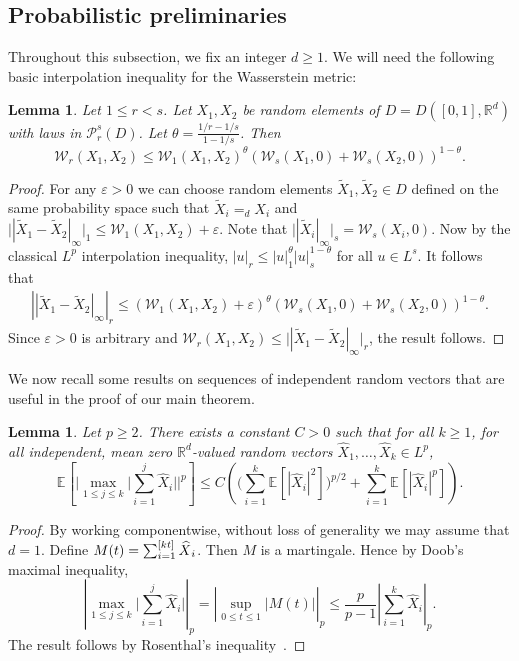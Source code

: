 \documentclass[11pt,a4paper,reqno,oneside]{amsart}
\newcommand{\R}{\ensuremath{\mathbb{R}}}%
\newcommand{\pnorm}[1]{\left|#1\right|}
\newcommand{\eqd}{=_d}
\newcommand{\Ex}[2][]{\mathbb{E}_{#1\!\!}\left[#2\right]}
\newcommand{\eps}{\varepsilon}
\newcommand{\wass}{\mathcal{W}}
\newcommand{\shat}[1]{\vphantom{#1}\smash[t]{\widehat{#1}}}
\newtheorem{lemma}[theorem]{Lemma}
\theoremstyle{definition}
\theoremstyle{remark}
\numberwithin{equation}{section}
\begin{document}
	\subsection{Probabilistic preliminaries}
	Throughout this subsection, we fix an integer $d\ge 1$. We will need the following basic interpolation inequality for the Wasserstein metric:
	\begin{lemma}\label{lem:wasserstein_interpolation}
	Let $1\le r< s$. Let $X_1,X_2$ be random elements of $D=D([0,1],\R^d)$ with laws in $ \mathcal{P}_r^s(D)$. Let $\theta = \frac{1/r-1/s}{1-1/s}$. Then 
	\[ \wass_r(X_1,X_2) \le \wass_1(X_1,X_2)^{\theta}(\wass_s(X_1,0)+\wass_s(X_2,0))^{1-\theta}. \]
\end{lemma}
\begin{proof}
	For any $\eps>0$ we can choose random elements $\tilde X_1, \tilde X_2 \in D$ defined on the same probability space such that $\tilde X_i \eqd X_i $ and $\big||\tilde X_1-\tilde X_2|_\infty\big|_1\le \wass_1(X_1,X_2)+\eps$. Note that $\big||\tilde X_i|_\infty\big|_s=\wass_s(X_i,0)$. Now by the classical $L^p$ interpolation inequality, $\pnorm{u}_r \le \pnorm{u}_1^\theta \pnorm{u}_s^{1-\theta}$ for all $u\in L^s$. It follows that
	\begin{align*}
		\pnorm{|\tilde X_1-\tilde X_2|_\infty}_r \le (\wass_1(X_1,X_2)+\eps)^\theta (\wass_s(X_1,0)+\wass_s(X_2,0))^{1-\theta}.
	\end{align*}
	Since $\eps>0$ is arbitrary and $\wass_r(X_1,X_2)\le\big||\tilde X_1-\tilde X_2|_\infty\big|_r$, the result follows.
\end{proof}
We now recall some results on sequences of independent random vectors that are useful in the proof of our main theorem.
	\begin{lemma}\label{lemma:maximal_rosenthal}
		Let $p\ge 2$. There exists a constant $C>0$ such that for all $k\ge 1$, for all independent, mean zero $\R^d$-valued random vectors $\widehat{X}_1,\dots,\widehat{X}_{k}\in L^p$,
		\begin{equation*}
			\Ex{\biggl|\max_{1\le j\le k}\Big|\sum_{i=1}^{j} \widehat{X}_i\Big| \biggr|^p}\le C\left(\biggl(\sum_{i=1}^{k} \Ex{|\widehat{X}_i|^2}\biggr)^{p/2}+ \sum_{i=1}^{k} \Ex{|\widehat{X}_i|^p}\right).
		\end{equation*}  
	\end{lemma}
	\begin{proof}
		By working componentwise, without loss of generality we may assume that $ d = 1 $. Define $ M(t)=\sum_{i=1}^{[kt]}\shat{X}_i $. Then $ M $ is a martingale. Hence by Doob's maximal inequality, \[ \pnorm{\max_{1\le j\le k}\bigg|\sum_{i=1}^{j} \widehat{X}_i\bigg|}_p=\pnorm{\sup_{0\le t\le 1}|M(t)|}_p\le \frac{p}{p-1}\pnorm{\sum_{i=1}^k \widehat{X}_i}_p. \]
		The result follows by Rosenthal's inequality~\cite{rosenthal1970subspaces}.
	\end{proof}
\end{document}
